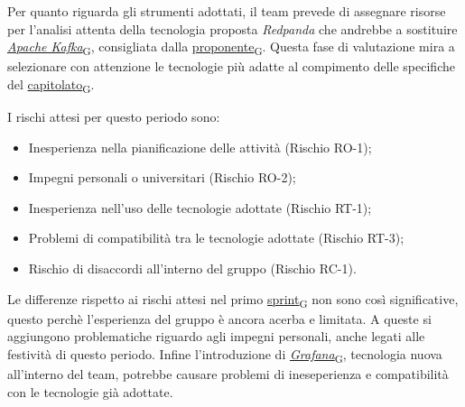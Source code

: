 Per quanto riguarda gli strumenti adottati, il team prevede di assegnare risorse per l'analisi attenta della tecnologia proposta \textit{Redpanda} che andrebbe a sostituire \href{https://7last.github.io/docs/rtb/documentazione-interna/glossario\#apache-kafka}{\textit{Apache Kafka}\textsubscript{G}}, consigliata dalla \href{https://7last.github.io/docs/rtb/documentazione-interna/glossario\#proponente}{proponente\textsubscript{G}}. Questa fase di valutazione mira a selezionare con attenzione le tecnologie più adatte al compimento delle specifiche del \href{https://7last.github.io/docs/rtb/documentazione-interna/glossario\#capitolato}{capitolato\textsubscript{G}}.

I rischi attesi per questo periodo sono:
\begin{itemize}
	\item Inesperienza nella pianificazione delle attività (Rischio RO-1);
	\item Impegni personali o universitari (Rischio RO-2);
	\item Inesperienza nell'uso delle tecnologie adottate (Rischio RT-1);
	\item Problemi di compatibilità tra le tecnologie adottate (Rischio RT-3);
	\item Rischio di disaccordi all'interno del gruppo (Rischio RC-1).
\end{itemize}
Le differenze rispetto ai rischi attesi nel primo \href{https://7last.github.io/docs/rtb/documentazione-interna/glossario\#sprint}{sprint\textsubscript{G}} non sono così significative, questo perchè l'esperienza del gruppo è ancora acerba e limitata.
A queste si aggiungono problematiche riguardo agli impegni personali, anche legati alle festività di questo periodo. Infine l'introduzione di \href{https://7last.github.io/docs/rtb/documentazione-interna/glossario\#grafana}{\textit{Grafana}\textsubscript{G}},
tecnologia nuova all'interno del team, potrebbe causare problemi di ineseperienza e compatibilità con le tecnologie già adottate.

